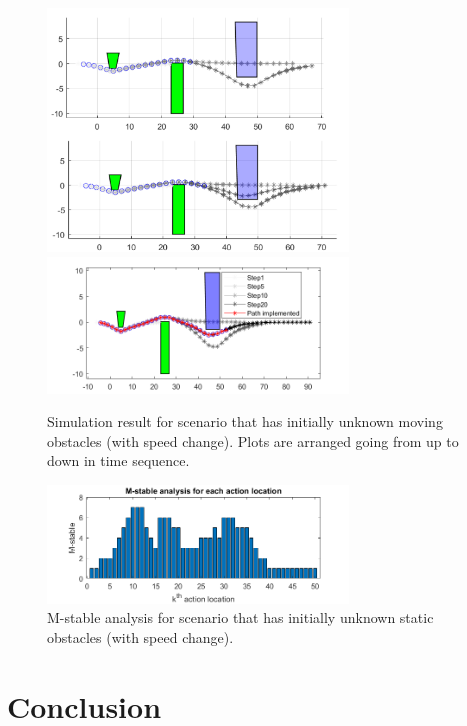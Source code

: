 \documentclass{ifacconf}
\begin{document}
\begin{figure}[htbp]
\begin{center}
\includegraphics[width=8cm]{src/3_2_1.png}
\includegraphics[width=8cm]{src/3_2_4.png}
\caption{Simulation result for scenario that has initially unknown moving obstacles (with speed change). Plots are arranged going from up to down in time sequence.}
\label{fig: mpc}
\end{center}
\end{figure}

\begin{figure}[htbp]
\begin{center}
\includegraphics[width=8cm]{src/3_2_M-stable.png}
\caption{M-stable analysis for scenario that has initially unknown static obstacles (with speed change). }
\label{fig: mpc}
\end{center}
\end{figure}



\section{Conclusion}
\end{document}

